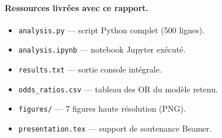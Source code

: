 \documentclass[11pt,a4paper,twoside]{report}
\theoremstyle{definition}
\begin{document}
\paragraph{Ressources livrées avec ce rapport.}
\begin{itemize}\itemsep0.2em
  \item \texttt{analysis.py} --- script Python complet (500 lignes).
  \item \texttt{analysis.ipynb} --- notebook Jupyter exécuté.
  \item \texttt{results.txt} --- sortie console intégrale.
  \item \texttt{odds\_ratios.csv} --- tableau des OR du modèle retenu.
  \item \texttt{figures/} --- 7 figures haute résolution (PNG).
  \item \texttt{presentation.tex} --- support de soutenance Beamer.
\end{itemize}
\end{document}
